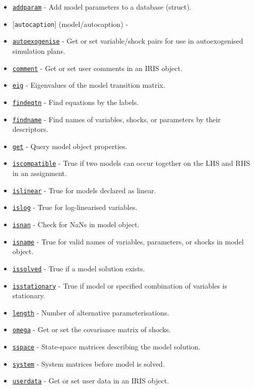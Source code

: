  \begin{itemize}
 \item
   \href{model/addparam}{\texttt{addparam}} - Add model parameters to a
   database (struct).
 \item
   {[}\texttt{autocaption}{]} (model/autocaption) -
 \item
   \href{model/autoexogenise}{\texttt{autoexogenise}} - Get or set
   variable/shock pairs for use in autoexogenised simulation plans.
 \item
   \href{model/comment}{\texttt{comment}} - Get or set user comments in
   an IRIS object.
 \item
   \href{model/eig}{\texttt{eig}} - Eigenvalues of the model transition
   matrix.
 \item
   \href{model/findeqtn}{\texttt{findeqtn}} - Find equations by the
   labels.
 \item
   \href{model/findname}{\texttt{findname}} - Find names of variables,
   shocks, or parameters by their descriptors.
 \item
   \href{model/get}{\texttt{get}} - Query model object properties.
 \item
   \href{model/iscompatible}{\texttt{iscompatible}} - True if two models
   can occur together on the LHS and RHS in an assignment.
 \item
   \href{model/islinear}{\texttt{islinear}} - True for models declared as
   linear.
 \item
   \href{model/islog}{\texttt{islog}} - True for log-linearised
   variables.
 \item
   \href{model/isnan}{\texttt{isnan}} - Check for NaNs in model object.
 \item
   \href{model/isname}{\texttt{isname}} - True for valid names of
   variables, parameters, or shocks in model object.
 \item
   \href{model/issolved}{\texttt{issolved}} - True if a model solution
   exists.
 \item
   \href{model/isstationary}{\texttt{isstationary}} - True if model or
   specified combination of variables is stationary.
 \item
   \href{model/length}{\texttt{length}} - Number of alternative
   parameterisations.
 \item
   \href{model/omega}{\texttt{omega}} - Get or set the covariance matrix
   of shocks.
 \item
   \href{model/sspace}{\texttt{sspace}} - State-space matrices describing
   the model solution.
 \item
   \href{model/system}{\texttt{system}} - System matrices before model is
   solved.
 \item
   \href{model/userdata}{\texttt{userdata}} - Get or set user data in an
   IRIS object.
 \end{itemize}
 
